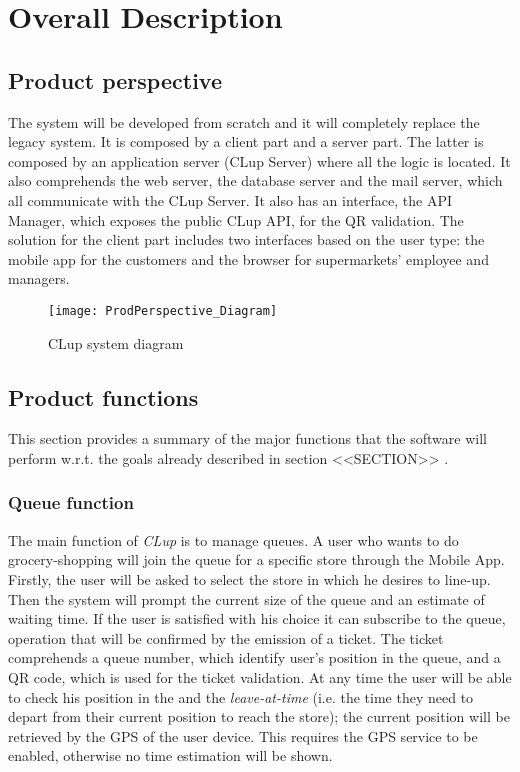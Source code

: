\chapter{Overall Description}

\section{Product perspective}

The system will be developed from scratch and it will completely replace the legacy system. \newline
It is composed by a client part and a server part.
The latter is composed by an application server (CLup Server) where all the logic is located. It also comprehends the web server, the database server and the mail server,
which all communicate with the CLup Server.
It also has an interface, the API Manager, which exposes the public CLup API, for the QR validation.\newline
The solution for the client part includes two interfaces based on the user type: the mobile app for the customers and the browser for supermarkets' employee and managers.
\begin{figure}[H]
	\centering
	\texttt{[image: ProdPerspective\_Diagram]}
	\caption{CLup system diagram}	
\end{figure}	 

\section{Product functions}
This section provides a summary of the major functions that the software will perform w.r.t. the goals already described in section <<SECTION>> .

\subsection{Queue function}
The main function of \textit{CLup} is to manage queues. A user who wants to do grocery-shopping will join the queue for a specific store through the Mobile App.\newline
Firstly, the user will be asked to select the store in which he desires to line-up.\newline
Then the system will prompt the current size of the queue and an estimate of waiting time. If the user is satisfied with his choice it can subscribe to the queue, operation that will be confirmed by the emission of a ticket. The ticket comprehends a queue number, which identify user's position in the queue, and a QR code, which is used for the ticket validation. At any time the user will be able to check his position in the and the \textit{leave-at-time} (i.e. the time they need to depart from their current position to reach the store); the current position will be retrieved by the GPS of the user device. This requires the GPS service to be enabled, otherwise no time estimation will be shown.

